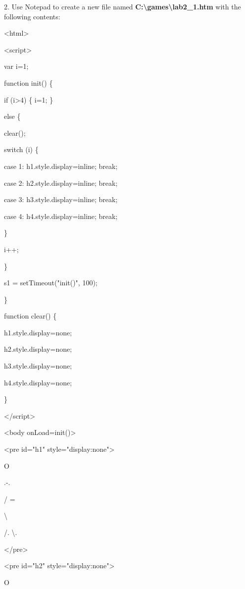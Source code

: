 \documentclass[
]{article}
\begin{document}
2. Use Notepad to create a new file named
\textbf{C:\textbackslash games\textbackslash lab2\_1.htm} with the
following contents:

\textless html\textgreater{}

\textless script\textgreater{}

var i=1;

function init() \{

if (i\textgreater4) \{ i=1; \}

else \{

clear();

switch (i) \{

case 1: h1.style.display=\textquotesingle inline\textquotesingle; break;

case 2: h2.style.display=\textquotesingle inline\textquotesingle; break;

case 3: h3.style.display=\textquotesingle inline\textquotesingle; break;

case 4: h4.style.display=\textquotesingle inline\textquotesingle; break;

\}

i++;

\}

s1 = setTimeout("init()", 100);

\}

function clear() \{

h1.style.display=\textquotesingle none\textquotesingle;

h2.style.display=\textquotesingle none\textquotesingle;

h3.style.display=\textquotesingle none\textquotesingle;

h4.style.display=\textquotesingle none\textquotesingle;

\}

\textless/script\textgreater{}

\textless body onLoad=init()\textgreater{}

\textless pre id="h1" style="display:none"\textgreater{}

O

.\textbar-.\textquotesingle{}

/ =

\textbar{} \textbackslash{}

/. \textbackslash.

\textless/pre\textgreater{}

\textless pre id="h2" style="display:none"\textgreater{}

O
\end{document}
